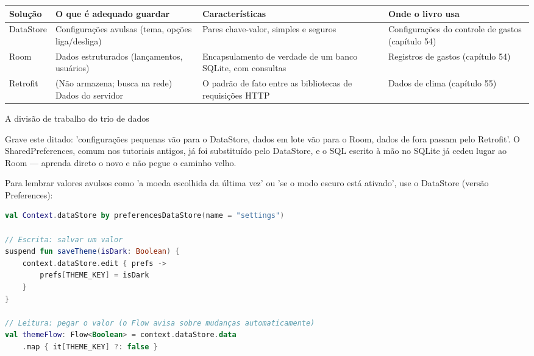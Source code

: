 


\begin{center}
\begin{tabularx}{\linewidth}{|X|X|X|X|}
\hline
\textbf{Solução} & \textbf{O que é adequado guardar} & \textbf{Características} & \textbf{Onde o livro usa} \tabularnewline
\hline
DataStore & Configurações avulsas (tema, opções liga/desliga) & Pares chave-valor, simples e seguros & Configurações do controle de gastos (capítulo 54) \tabularnewline
Room & Dados estruturados (lançamentos, usuários) & Encapsulamento de verdade de um banco SQLite, com consultas & Registros de gastos (capítulo 54) \tabularnewline
Retrofit & (Não armazena; busca na rede) Dados do servidor & O padrão de fato entre as bibliotecas de requisições HTTP & Dados de clima (capítulo 55) \tabularnewline
\hline
\end{tabularx}
\end{center}

\begin{center}\small\color{gray}A divisão de trabalho do trio de dados\end{center}

Grave este ditado: 'configurações pequenas vão para o DataStore, dados em lote vão para o Room, dados de fora passam pelo Retrofit'. O SharedPreferences, comum nos tutoriais antigos, já foi substituído pelo DataStore, e o SQL escrito à mão no SQLite já cedeu lugar ao Room — aprenda direto o novo e não pegue o caminho velho.


Para lembrar valores avulsos como 'a moeda escolhida da última vez' ou 'se o modo escuro está ativado', use o DataStore (versão Preferences):

\begin{lstlisting}[language=Kotlin]
val Context.dataStore by preferencesDataStore(name = "settings")

// Escrita: salvar um valor
suspend fun saveTheme(isDark: Boolean) {
    context.dataStore.edit { prefs ->
        prefs[THEME_KEY] = isDark
    }
}

// Leitura: pegar o valor (o Flow avisa sobre mudanças automaticamente)
val themeFlow: Flow<Boolean> = context.dataStore.data
    .map { it[THEME_KEY] ?: false }
\end{lstlisting}

